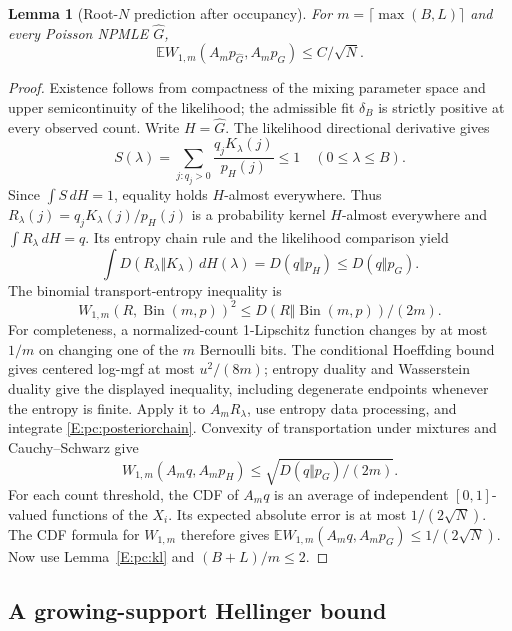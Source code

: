 \documentclass[11pt,a4paper]{article}
\newtheorem{lemma}[theorem]{Lemma}
\theoremstyle{definition}
\theoremstyle{remark}
\numberwithin{equation}{section}
\begin{document}
\begin{lemma}[Root-$N$ prediction after occupancy]\label{E:pc:transport}
For $m=\lceil\max(B,L)\rceil$ and every Poisson NPMLE $\widehat G$,
\begin{equation}\label{E:pc:transportbound}
       \mathbb E W_{1,m}(A_mp_{\widehat G},A_mp_G)\le C/\sqrt N.
\end{equation}
\end{lemma}
\begin{proof}
Existence follows from compactness of the mixing parameter space
and upper semicontinuity of the likelihood; the admissible fit
$\delta_B$ is strictly positive at every observed count.  Write
$H=\widehat G$.  The likelihood directional derivative gives
\[
 S(\lambda)=\sum_{j:q_j>0}\frac{q_jK_\lambda(j)}{p_H(j)}\le1
                    \quad(0\le\lambda\le B).
\]
Since $\int S\,dH=1$, equality holds $H$-almost everywhere.
Thus $R_\lambda(j)=q_jK_\lambda(j)/p_H(j)$ is a probability kernel
$H$-almost everywhere and $\int R_\lambda\,dH=q$.  Its entropy
chain rule and the likelihood comparison yield
\begin{equation}\label{E:pc:posteriorchain}
 \int D(R_\lambda\Vert K_\lambda)\,dH(\lambda)
       =D(q\Vert p_H)\le D(q\Vert p_G).
\end{equation}
The binomial transport-entropy inequality is
\[
 W_{1,m}(R,\operatorname{Bin}(m,p))^2
          \le D(R\Vert\operatorname{Bin}(m,p))/(2m).
\]
For completeness, a normalized-count 1-Lipschitz function changes
by at most $1/m$ on changing one of the $m$ Bernoulli bits.
The conditional Hoeffding bound gives centered log-mgf at most
$u^2/(8m)$; entropy duality and Wasserstein duality give the
displayed inequality, including degenerate endpoints whenever the
entropy is finite.  Apply it to $A_mR_\lambda$, use entropy data
processing, and integrate \eqref{E:pc:posteriorchain}.  Convexity of
transportation under mixtures and Cauchy--Schwarz give
\[
 W_{1,m}(A_mq,A_mp_H)
                  \le\sqrt{D(q\Vert p_G)/(2m)}.
\]
For each count threshold, the CDF of $A_mq$ is an average of
independent $[0,1]$-valued functions of the $X_i$.  Its expected
absolute error is at most $1/(2\sqrt N)$.  The CDF formula for
$W_{1,m}$ therefore gives
$\mathbb E W_{1,m}(A_mq,A_mp_G)\le1/(2\sqrt N)$.
Now use Lemma~\ref{E:pc:kl} and $(B+L)/m\le2$.
\end{proof}

\subsection{A growing-support Hellinger bound}
\end{document}
